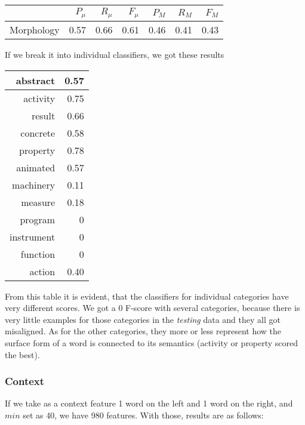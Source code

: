 \documentclass[letterpaper]{article}
\begin{document}
\begin{table}[h]
\begin{tabular}{|r|r|r|r|r|r|r|}
 \hline
 & $P_\mu$ & $R_\mu$ & $F_\mu$ & $P_M$ & $R_M$  & $F_M$ \\ \hline
Morphology & 0.57 & 0.66 & 0.61 & 0.46 & 0.41 & 0.43 \\ \hline
\end{tabular}

\end{table}

If we break it into individual classifiers, we got these results

\begin{tabular}{|r|r|}
\hline
abstract & 0.57 \\ \hline
activity & 0.75 \\ \hline
result & 0.66 \\ \hline
concrete & 0.58 \\ \hline
property & 0.78 \\ \hline
animated & 0.57 \\ \hline
machinery & 0.11 \\ \hline
measure & 0.18 \\ \hline
program & 0 \\ \hline
instrument & 0 \\ \hline
function & 0 \\ \hline
action & 0.40 \\ \hline

\end{tabular}

From this table it is evident, that the classifiers for individual categories have very different scores. 
We got a 0 F-score with several categories, %
because there is very little examples for those categories in 
the \emph{testing} data and they all got misaligned. As for the other categories,
they more or less represent how the surface form of a word is connected to its semantics (activity or property
scored the best).


\subsubsection{Context}
If we take as a context feature 1 word on the left and 1 word on the right, and $min$ set as 40, we have 980 features. With those, results are as follows:
\end{document}
